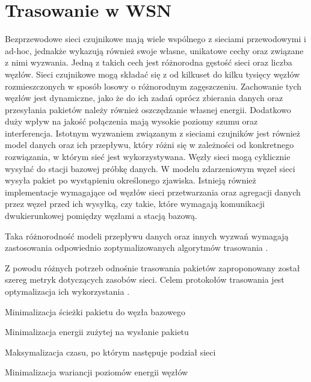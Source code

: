 \section{Trasowanie w WSN}
Bezprzewodowe sieci czujnikowe mają wiele wspólnego z sieciami przewodowymi i ad-hoc, jednakże wykazują również swoje własne, unikatowe cechy oraz związane z nimi wyzwania.
Jedną z takich cech jest różnorodna gęstość sieci oraz liczba węzłów. Sieci czujnikowe mogą składać się z od kilkuset do kilku tysięcy węzłów rozmieszczonych w sposób losowy o różnorodnym zagęszczeniu. Zachowanie tych węzłów jest dynamiczne, jako że do ich zadań oprócz zbierania danych oraz przesyłania pakietów należy również oszczędzanie własnej energii. Dodatkowo duży wpływ na jakość połączenia mają wysokie poziomy szumu oraz interferencja.
Istotnym wyzwaniem związanym z sieciami czujników jest również model danych oraz ich przepływu, który różni się w zależności od konkretnego rozwiązania, w którym sieć jest wykorzystywana. Węzły sieci mogą cyklicznie wysyłać do stacji bazowej próbkę danych. W modelu zdarzeniowym węzeł sieci wysyła pakiet po wystąpieniu określonego zjawiska. Istnieją również implementacje wymagające od węzłów sieci przetwarzania oraz agregacji danych przez węzeł przed ich wysyłką, czy takie, które wymagają komunikacji dwukierunkowej pomiędzy węzłami a stacją bazową.


Taka różnorodność modeli przepływu danych oraz innych wyzwań wymagają zastosowania odpowiednio zoptymalizowanych algorytmów trasowania \cite{Abdullah2014, Sohraby2006}.

Z powodu różnych potrzeb odnośnie trasowania pakietów zaproponowany został szereg metryk dotyczących zasobów sieci. Celem protokołów trasowania jest optymalizacja ich wykorzystania \cite{Dargie2010, Biradar2009}.

Minimalizacja ścieżki pakietu do węzła bazowego

Minimalizacja energii zużytej na wysłanie pakietu

Maksymalizacja czasu, po którym następuje podział sieci

Minimalizacja wariancji poziomów energii węzłów


